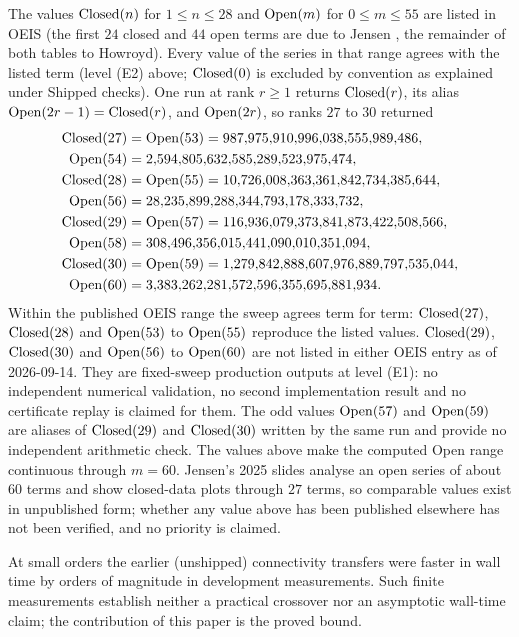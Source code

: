 The values $\operatorname{Closed}(n)$ for $1\le n\le28$ and $\operatorname{Open}(m)$ for $0\le m\le55$
are listed in OEIS \cite{OEIS_A005315,OEIS_A005316} (the first $24$ closed
and $44$ open terms are due to Jensen \cite{Jensen2000}, the remainder of
both tables to Howroyd). Every value of the series in that range agrees with
the listed term (level (E2) above; $\operatorname{Closed}(0)$ is excluded by convention as
explained under Shipped checks). One run at rank $r\ge1$ returns
$\operatorname{Closed}(r)$, its alias $\operatorname{Open}(2r-1)=\operatorname{Closed}(r)$, and $\operatorname{Open}(2r)$, so ranks
$27$ to $30$ returned
\begin{align*}
\operatorname{Closed}(27)&=\operatorname{Open}(53)=987{,}975{,}910{,}996{,}038{,}555{,}989{,}486,\\
\operatorname{Open}(54)&=2{,}594{,}805{,}632{,}585{,}289{,}523{,}975{,}474,\\
\operatorname{Closed}(28)&=\operatorname{Open}(55)=10{,}726{,}008{,}363{,}361{,}842{,}734{,}385{,}644,\\
\operatorname{Open}(56)&=28{,}235{,}899{,}288{,}344{,}793{,}178{,}333{,}732,\\
\operatorname{Closed}(29)&=\operatorname{Open}(57)=116{,}936{,}079{,}373{,}841{,}873{,}422{,}508{,}566,\\
\operatorname{Open}(58)&=308{,}496{,}356{,}015{,}441{,}090{,}010{,}351{,}094,\\
\operatorname{Closed}(30)&=\operatorname{Open}(59)=1{,}279{,}842{,}888{,}607{,}976{,}889{,}797{,}535{,}044,\\
\operatorname{Open}(60)&=3{,}383{,}262{,}281{,}572{,}596{,}355{,}695{,}881{,}934.
\end{align*}
Within the published OEIS range the sweep agrees term for term:
$\operatorname{Closed}(27)$, $\operatorname{Closed}(28)$ and $\operatorname{Open}(53)$ to $\operatorname{Open}(55)$ reproduce the
listed values. $\operatorname{Closed}(29)$, $\operatorname{Closed}(30)$ and $\operatorname{Open}(56)$ to $\operatorname{Open}(60)$
are not listed in either OEIS entry as of 2026-09-14. They are fixed-sweep
production outputs at level (E1): no independent numerical validation, no
second implementation result and no certificate replay is claimed for them.
The odd values $\operatorname{Open}(57)$ and $\operatorname{Open}(59)$ are aliases of $\operatorname{Closed}(29)$ and
$\operatorname{Closed}(30)$ written by the same run and provide no independent arithmetic
check. The values above make the computed Open range continuous through
$m=60$. Jensen's 2025 slides \cite{Jensen2025} analyse an open series of
about $60$ terms and show closed-data plots through $27$ terms, so comparable
values exist in unpublished form; whether any value above has been published
elsewhere has not been verified, and no priority is claimed.

At small orders the earlier (unshipped) connectivity transfers were faster
in wall time by orders of magnitude in development measurements. Such finite
measurements establish neither a practical crossover nor an asymptotic
wall-time claim; the contribution of this paper is the proved bound.
